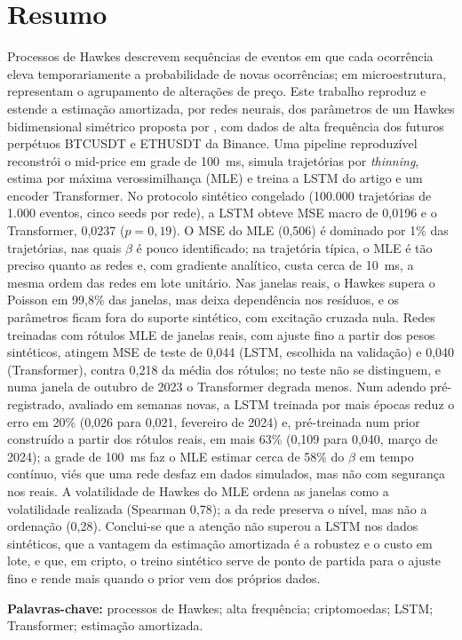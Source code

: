 \documentclass[12pt,a4paper,openany]{report}
\begin{document}
\begin{otherlanguage}{brazilian}
\chapter*{Resumo}

Processos de Hawkes descrevem sequências de eventos em que cada ocorrência eleva
temporariamente a probabilidade de novas ocorrências; em microestrutura, representam o
agrupamento de alterações de preço. Este trabalho reproduz e estende a estimação amortizada,
por redes neurais, dos parâmetros de um Hawkes bidimensional simétrico proposta por
\citet{lee2023}, com dados de alta frequência dos futuros perpétuos BTCUSDT e ETHUSDT da
Binance. Uma pipeline reproduzível reconstrói o mid-price em grade de 100~ms, simula trajetórias por \emph{thinning}, estima por máxima
verossimilhança (MLE) e treina a LSTM do artigo e um encoder Transformer. No protocolo
sintético congelado (100.000 trajetórias de 1.000 eventos, cinco seeds por rede), a LSTM
obteve MSE macro de 0,0196 e o Transformer, 0,0237 ($p=0{,}19$). O MSE do MLE (0,506) é
dominado por 1\% das trajetórias, nas quais $\beta$ é pouco identificado; na trajetória
típica, o MLE é tão preciso quanto as redes e, com gradiente analítico, custa cerca de 10~ms,
a mesma ordem das redes em lote unitário. Nas janelas reais, o Hawkes supera o Poisson em
99,8\% das janelas, mas deixa dependência nos resíduos, e os parâmetros ficam fora do suporte
sintético, com excitação cruzada nula. Redes treinadas com rótulos MLE de janelas reais, com
ajuste fino a partir dos pesos sintéticos, atingem MSE de teste de 0,044 (LSTM, escolhida na
validação) e 0,040 (Transformer), contra 0,218 da média dos rótulos; no teste não se
distinguem, e numa janela de outubro de 2023 o Transformer degrada menos. Num adendo pré-registrado, avaliado em semanas novas, a
LSTM treinada por mais épocas reduz o erro em 20\% (0,026 para 0,021, fevereiro de 2024) e,
pré-treinada num prior construído a partir dos rótulos reais, em mais 63\% (0,109 para
0,040, março de 2024); a grade de 100~ms faz o MLE estimar cerca de 58\% do $\beta$ em tempo
contínuo, viés que uma rede desfaz em dados simulados, mas não com segurança nos reais. A volatilidade de
Hawkes do MLE ordena as janelas como a volatilidade realizada (Spearman 0,78); a da rede
preserva o nível, mas não a ordenação (0,28). Conclui-se que a atenção não superou a LSTM nos
dados sintéticos, que a vantagem da estimação amortizada é a robustez e o custo em lote, e
que, em cripto, o treino sintético serve de ponto de partida para o ajuste fino e rende
mais quando o prior vem dos próprios dados.

\noindent\textbf{Palavras-chave:} processos de Hawkes; alta frequência; criptomoedas;
LSTM; Transformer; estimação amortizada.
\end{otherlanguage}
\end{document}

